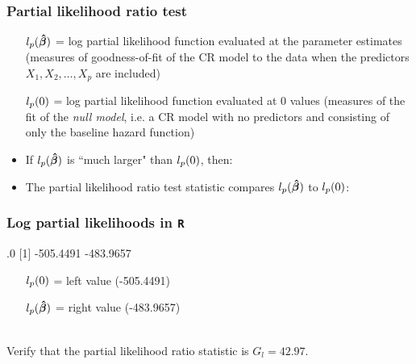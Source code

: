 \begin{frame}
\frametitle{Partial likelihood ratio test}
\begin{itemize}
\item[$l_p({\boldmath \mbox{$\hat{\beta}$}})$ = ] log partial likelihood function evaluated at the parameter estimates (measures of goodness-of-fit of the CR model to the data when the predictors $X_1,X_2,\ldots,X_p$ are included)
\item[$l_p(\boldmath{0})$ = ] log partial likelihood function evaluated at 0 values (measures of the fit of the \textit{null model}, i.e. a CR model with no predictors and consisting of only the baseline hazard function)
\item[]
\item If $l_p({\boldmath \mbox{$\hat{\beta}$}})$ is ``much larger" than $l_p(\boldmath{0})$, then:
\item[]
\item[]
\item[]
\item The partial likelihood ratio test statistic compares $l_p({\boldmath \mbox{$\hat{\beta}$}})$ to $l_p(\boldmath{0})$:
\item[]
\item[]
\item[]
\end{itemize}
\end{frame}


\begin{frame}[fragile]
\frametitle{Log partial likelihoods in \texttt{R}}
\begin{minipage}{0.43\textwidth}
\begin{Rout}{.0}
[1] -505.4491 -483.9657
\end{Rout}
\end{minipage}
\blankcolumn
\blankcolumn
\begin{minipage}{0.45\textwidth}
\begin{itemize}
\item[]
\item[]
\item[]
\item[]
\item[$l_p(\boldmath{0})$ = ] left value (-505.4491)
\item[$l_p({\boldmath \mbox{$\hat{\beta}$}})$ = ] right value (-483.9657)
\end{itemize}
\end{minipage}\\
\vskip10pt
Verify that the partial likelihood ratio statistic is $G_l=42.97$.
\vskip200pt
\end{frame}



